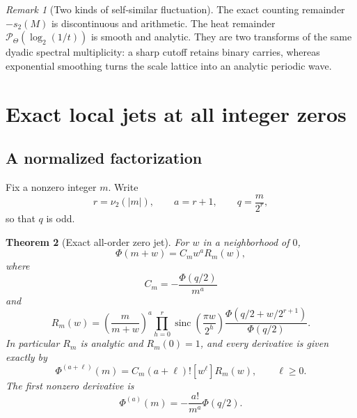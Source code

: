 \documentclass[11pt,oneside]{article}
\numberwithin{equation}{section}
\theoremstyle{plain}
\newtheorem{theorem}{Theorem}[section]
\theoremstyle{definition}
\theoremstyle{remark}
\newtheorem{remark}[theorem]{Remark}
\newcommand{\sinc}{\operatorname{sinc}}
\newcommand{\Pcal}{\mathcal P}
\begin{document}
\begin{remark}[Two kinds of self-similar fluctuation]
The exact counting remainder $-s_2(M)$ is discontinuous and arithmetic.  The heat remainder $\Pcal_\Theta(\log_2(1/t))$ is smooth and analytic.  They are two transforms of the same dyadic spectral multiplicity: a sharp cutoff retains binary carries, whereas exponential smoothing turns the scale lattice into an analytic periodic wave.
\end{remark}

\section{Exact local jets at all integer zeros}

\subsection{A normalized factorization}

Fix a nonzero integer $m$.  Write
\begin{equation}\label{eq:m-rq}
 r=\nu_2(|m|),\qquad a=r+1,\qquad q=\frac{m}{2^r},
\end{equation}
so that $q$ is odd.

\begin{theorem}[Exact all-order zero jet]\label{thm:local-jet}
For $w$ in a neighborhood of $0$,
\begin{equation}\label{eq:local-factor}
 \Phi(m+w)=C_mw^aR_m(w),
\end{equation}
where
\begin{equation}\label{eq:Cm}
 \boxed{\ C_m=-\frac{\Phi(q/2)}{m^a}\ }
\end{equation}
and
\begin{equation}\label{eq:Rm}
 R_m(w)=
 \left(\frac{m}{m+w}\right)^a
 \prod_{h=0}^{r}\sinc\!\left(\frac{\pi w}{2^h}\right)
 \frac{\Phi\!\left(q/2+w/2^{r+1}\right)}{\Phi(q/2)}.
\end{equation}
In particular $R_m$ is analytic and $R_m(0)=1$, and every derivative is given exactly by
\begin{equation}\label{eq:all-jets}
 \boxed{\ \Phi^{(a+\ell)}(m)
 =C_m(a+\ell)![w^\ell]R_m(w),\qquad \ell\ge0.\ }
\end{equation}
The first nonzero derivative is
\begin{equation}\label{eq:first-derivative-zero}
 \boxed{\ \Phi^{(a)}(m)=-\frac{a!}{m^a}\Phi(q/2).\ }
\end{equation}
\end{theorem}
\end{document}
